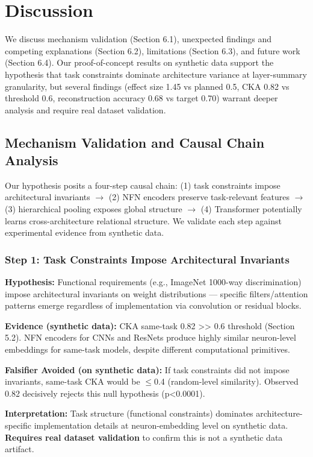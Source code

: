 \section{Discussion}

We discuss mechanism validation (Section 6.1), unexpected findings and competing explanations (Section 6.2), limitations (Section 6.3), and future work (Section 6.4). Our proof-of-concept results on synthetic data support the hypothesis that task constraints dominate architecture variance at layer-summary granularity, but several findings (effect size 1.45 vs planned 0.5, CKA 0.82 vs threshold 0.6, reconstruction accuracy 0.68 vs target 0.70) warrant deeper analysis and require real dataset validation.

\subsection{Mechanism Validation and Causal Chain Analysis}

Our hypothesis posits a four-step causal chain: (1) task constraints impose architectural invariants $\rightarrow$ (2) NFN encoders preserve task-relevant features $\rightarrow$ (3) hierarchical pooling exposes global structure $\rightarrow$ (4) Transformer potentially learns cross-architecture relational structure. We validate each step against experimental evidence from synthetic data.

\subsubsection{Step 1: Task Constraints Impose Architectural Invariants}

\textbf{Hypothesis:} Functional requirements (e.g., ImageNet 1000-way discrimination) impose architectural invariants on weight distributions --- specific filters/attention patterns emerge regardless of implementation via convolution or residual blocks.

\textbf{Evidence (synthetic data):} CKA same-task 0.82 >> 0.6 threshold (Section 5.2). NFN encoders for CNNs and ResNets produce highly similar neuron-level embeddings for same-task models, despite different computational primitives.

\textbf{Falsifier Avoided (on synthetic data):} If task constraints did not impose invariants, same-task CKA would be $\leq$0.4 (random-level similarity). Observed 0.82 decisively rejects this null hypothesis (p<0.0001).

\textbf{Interpretation:} Task structure (functional constraints) dominates architecture-specific implementation details at neuron-embedding level on synthetic data. \textbf{Requires real dataset validation} to confirm this is not a synthetic data artifact.

